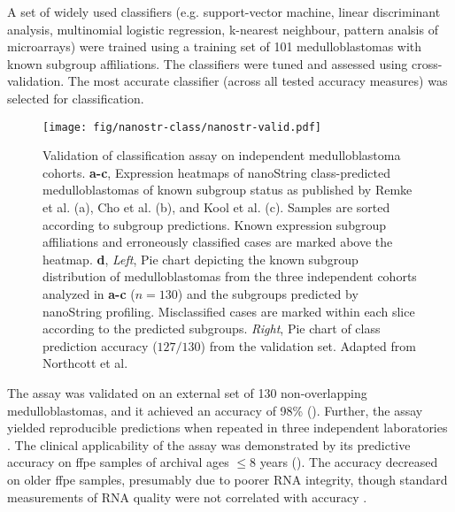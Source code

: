 A set of widely used classifiers (e.g. support-vector machine, linear discriminant analysis, multinomial logistic regression, k-nearest neighbour, pattern analsis of microarrays) were trained using a training set of 101 medulloblastomas with known subgroup affiliations. The classifiers were tuned and assessed using cross-validation. The most accurate classifier (across all tested accuracy measures) was selected for classification.

\begin{figure}[hb]
	\begin{center}
		\texttt{[image: fig/nanostr-class/nanostr-valid.pdf]}
	\end{center}
	\caption[Validation of classification assay on independent medulloblastoma cohorts]
	{
	Validation of classification assay on independent medulloblastoma cohorts.
	\textbf{a-c}, Expression heatmaps of nanoString class-predicted medulloblastomas of known subgroup status as published by Remke et al. (a), Cho et al. (b), and Kool et al. (c). Samples are sorted according to subgroup predictions. Known expression subgroup affiliations and erroneously classified cases are marked above the heatmap.
	\textbf{d}, \emph{Left}, Pie chart depicting the known subgroup distribution of medulloblastomas from the three independent cohorts analyzed in \textbf{a-c} ($n = 130$) and the subgroups predicted by nanoString profiling. Misclassified cases are marked within each slice according to the predicted subgroups. \emph{Right}, Pie chart of class prediction accuracy ($127/130$) from the validation set. Adapted from Northcott et al.
	}
	\label{fig:nanostr-valid}
\end{figure}

\clearpage

The assay was validated on an external set of 130 non-overlapping medulloblastomas, and it achieved an accuracy of 98\% (). Further, the assay yielded reproducible predictions when repeated in three independent laboratories . The clinical applicability of the assay was demonstrated by its predictive accuracy on \gls{ffpe} samples of archival ages $\leq 8$ years (). The accuracy decreased on older \gls{ffpe} samples, presumably due to poorer RNA integrity, though standard measurements of RNA quality were not correlated with accuracy .

